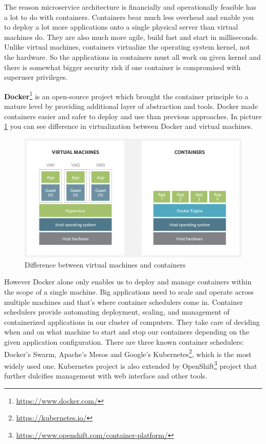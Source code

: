 \documentclass[12pt,oneside]{fithesis2}
\begin{document}
The reason microservice architecture is financially and operationally feasible has a lot to do with containers. Containers bear much less overhead and enable you to deploy a lot more applications onto a single physical server than virtual machines do. They are also much more agile, build fast and start in milliseconds. Unlike virtual machines, containers virtualize the operating system kernel, not the hardware. So the applications in containers must all work on given kernel and there is somewhat bigger security risk if one container is compromised with superuser privileges.

\textbf{Docker}\footnote{\url{https://www.docker.com/}} is an open-source project which brought the container principle to a mature level by providing additional layer of abstraction and tools. Docker made containers easier and safer to deploy and use than previous approaches. In picture \ref{vm_vs_docker} you can see difference in virtualization between Docker and virtual machines.

\begin{figure}[ht!]
	\label{vm_vs_docker}
	\centering
	\includegraphics[width=\textwidth]{images/virtual_machines_vs_containers.png}
	\caption{Difference between virtual machines and containers\footnotemark}
\end{figure}


However Docker alone only enables us to deploy and manage containers within the scope of a single machine. Big applications need to scale and operate across multiple machines and that's where container schedulers come in. Container schedulers provide automating deployment, scaling, and management of containerized applications in our cluster of computers. They take care of deciding when and on what machine to start and stop our containers depending on the given application configuration. There are three known container schedulers: Docker's Swarm, Apache's Mesos and Google's Kubernetes\footnote{\url{https://kubernetes.io/}}, which is the most widely used one. Kubernetes project is also extended by OpenShift\footnote{\url{https://www.openshift.com/container-platform/}} project that further dulcifies management with web interface and other tools.
\end{document}

